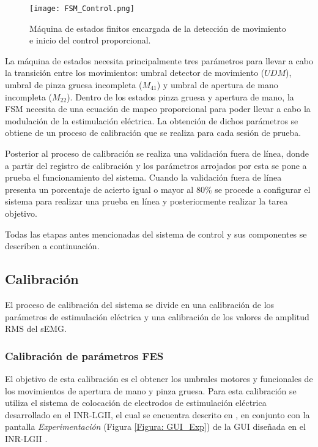 
\begin{figure}[htbp]
	\centering
	\texttt{[image: FSM\_Control.png]}
	\caption[FSM para control]{Máquina de estados finitos encargada de la detección de movimiento e inicio del control proporcional.}
	\label{Figura: FSM_Control}
\end{figure}

La máquina de estados necesita principalmente tres parámetros para llevar a cabo la transición entre los movimientos: umbral detector de movimiento ($UDM$), umbral de pinza gruesa incompleta ($M_{41}$) y umbral de apertura de mano incompleta ($M_{22}$). Dentro de los estados pinza gruesa y apertura de mano, la FSM necesita de una ecuación de mapeo proporcional para poder llevar a cabo la modulación de la estimulación eléctrica. La obtención de dichos parámetros se obtiene de un proceso de calibración que se realiza para cada sesión de prueba.

Posterior al proceso de calibración se realiza una validación fuera de línea, donde a partir del registro de calibración y los parámetros arrojados por esta se pone a prueba el funcionamiento del sistema. Cuando la validación fuera de línea presenta un porcentaje de acierto igual o mayor al 80$\%$ se procede a configurar el sistema para realizar una prueba en línea y posteriormente realizar la tarea objetivo.

Todas las etapas antes mencionadas del sistema de control y sus componentes se describen a continuación.

\subsection{Calibración}\label{Sec: Calibracion}
El proceso de calibración del sistema se divide en una calibración de los parámetros de estimulación eléctrica y una calibración de los valores de amplitud RMS del sEMG.

\subsubsection{Calibración de parámetros FES}\label{Sec:CalFES}
El objetivo de esta calibración es el obtener los umbrales motores y funcionales de los movimientos de apertura de mano y pinza gruesa. Para esta calibración se utiliza el sistema de colocación de electrodos de estimulación eléctrica desarrollado en el INR-LGII, el cual se encuentra descrito en \cite{AnaMartin2019}, en conjunto con la pantalla \emph{Experimentación} (Figura \ref{Figura: GUI_Exp}) de la GUI diseñada en el INR-LGII \cite{JanethFuentes2018}.

